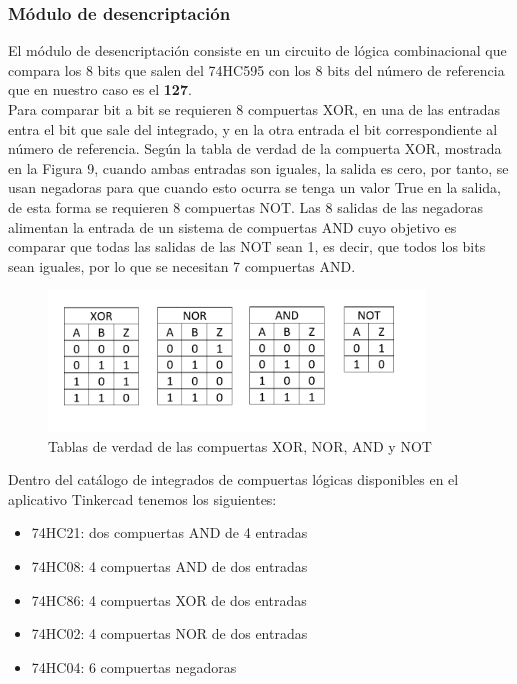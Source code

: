 \documentclass{article}
\begin{document}
\subsubsection{Módulo de desencriptación}
El módulo de desencriptación consiste en un circuito de lógica combinacional que compara los 8 bits que salen del 74HC595 con los 8 bits del número de referencia que en nuestro caso es el \textbf{127}.\\

Para comparar bit a bit se requieren 8 compuertas XOR, en una de las entradas entra el bit que sale del integrado, y en la otra entrada el bit correspondiente al número de referencia. Según la tabla de verdad de la compuerta XOR, mostrada en la Figura 9, cuando ambas entradas son iguales, la salida es cero, por tanto, se usan negadoras para que cuando esto ocurra se tenga un valor True en la salida, de esta forma se requieren 8 compuertas NOT. Las 8 salidas de las negadoras alimentan la entrada de un sistema de compuertas AND cuyo objetivo es comparar que todas las salidas de las NOT sean 1, es decir, que todos los bits sean iguales, por lo que se necesitan 7 compuertas AND.\\


\begin{figure}[!ht] 
\includegraphics[width=10cm]{compuertas.png}
\centering
\caption{Tablas de verdad de las compuertas XOR, NOR, AND y NOT}
\end{figure}

Dentro del catálogo de integrados de compuertas lógicas disponibles en el aplicativo Tinkercad tenemos los siguientes:
\begin{itemize}
    \item 74HC21: dos compuertas AND de 4 entradas
    \item 74HC08: 4 compuertas AND de dos entradas
    \item 74HC86: 4 compuertas XOR de dos entradas
    \item 74HC02: 4 compuertas NOR de dos entradas
    \item 74HC04: 6 compuertas negadoras\\
\end{itemize}
\end{document}

